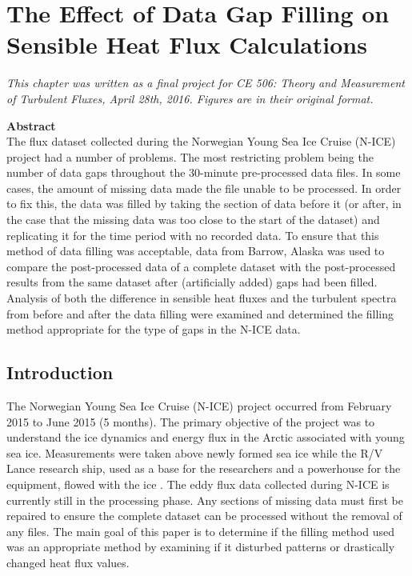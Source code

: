 \chapter{The Effect of Data Gap Filling on Sensible Heat Flux Calculations}
\bigskip
\begin{spacing}{1}
\begin{center}
\textit{This chapter was written as a final project for CE 506: Theory and Measurement of Turbulent Fluxes, April 28th, 2016. Figures are in their original format.}\\
\end{center}
\bigskip
\noindent \textbf{Abstract}\\
\noindent The flux dataset collected during the Norwegian Young Sea Ice Cruise (N-ICE) project had a number of problems. The most restricting problem being the number of data gaps throughout the 30-minute pre-processed data files. In some cases, the amount of missing data made the file unable to be processed. In order to fix this, the data was filled by taking the section of data before it (or after, in the case that the missing data was too close to the start of the dataset) and replicating it for the time period with no recorded data. To ensure that this method of data filling was acceptable, data from Barrow, Alaska was used to compare the post-processed data of a complete dataset with the post-processed results from the same dataset after (artificially added) gaps had been filled. Analysis of both the difference in sensible heat fluxes and the turbulent spectra from before and after the data filling were examined and determined the filling method appropriate for the type of gaps in the N-ICE data. 
\end{spacing}
\doublespacing

\section{Introduction}
The Norwegian Young Sea Ice Cruise (N-ICE) project occurred from February 2015 to June 2015 (5 months). The primary objective of the project was to understand the ice dynamics and energy flux in the Arctic associated with young sea ice. Measurements were taken above newly formed sea ice while the R/V Lance research ship, used as a base for the researchers and a powerhouse for the equipment, flowed with the ice \citep{granskog:2016}. The eddy flux data collected during N-ICE is currently still in the processing phase. Any sections of missing data must first be repaired to ensure the complete dataset can be processed without the removal of any files. The main goal of this paper is to determine if the filling method used was an appropriate method by examining if it disturbed patterns or drastically changed heat flux values.

